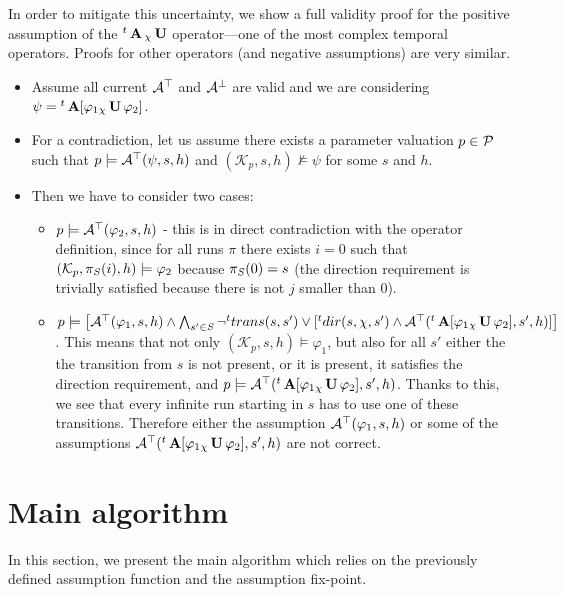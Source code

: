 In order to mitigate this uncertainty, we show a full validity proof for the positive assumption of the ${}^{t}\operatorname{\mathbf{A}}{}_{\chi}\operatorname{\mathbf{U}}$ operator—one of the most complex temporal operators. Proofs for other operators (and negative assumptions) are very similar.

\begin{itemize}
	\item Assume all current $\mathcal{A}^\top$ and $\mathcal{A}^\bot$ are valid and we are considering $ \psi = {}^{t} \operatorname{\mathbf{A}}[ \varphi_1 {}_{\chi}\operatorname{\mathbf{U}} \varphi_2 ]$.
	\item For a contradiction, let us assume there exists a parameter valuation $p \in \mathcal{P}$ such that $p \models \mathcal{A}^\top(\psi, s, h)$ and $(\mathcal{K}_p, s, h) \not\models \psi$ for some $s$ and $h$.
	\item Then we have to consider two cases:
	\begin{itemize}
		\item $p \models \mathcal{A}^\top(\varphi_2, s, h)$ - this is in direct contradiction with the operator definition, since for all runs $\pi$ there exists $i = 0$ such that $(\mathcal{K}_p, \pi_{\mathit{S}}(i), h) \models \varphi_2$ because $\pi_{\mathit{S}}(0) = s$ (the direction requirement is trivially satisfied because there is not $j$ smaller than $0$).
		\item $p \models \big[ \mathcal{A}^\top(\varphi_1, s, h) \land \bigwedge_{s' \in \mathit{S}} \neg{}^{t}trans(s,s') \lor [{}^{t}dir(s, \chi, s') \land \mathcal{A}^\top({}^{t}\operatorname{\mathbf{A}}[ \varphi_1 {}_{\chi}\operatorname{\mathbf{U}} \varphi_2], s', h)] \big]$. This means that not only $(\mathcal{K}_p, s, h) \models \varphi_1$, but also for all $s'$ either the the transition from $s$ is not present, or it is present, it satisfies the direction requirement, and $p \models \mathcal{A}^\top({}^{t}\operatorname{\mathbf{A}}[ \varphi_1 {}_{\chi}\operatorname{\mathbf{U}} \varphi_2], s', h)$. Thanks to this, we see that every infinite run starting in $s$ has to use one of these transitions. Therefore either the assumption $\mathcal{A}^\top(\varphi_1, s, h)$ or some of the assumptions $\mathcal{A}^\top({}^{t}\operatorname{\mathbf{A}}[ \varphi_1 {}_{\chi}\operatorname{\mathbf{U}} \varphi_2], s', h)$ are not correct.
	\end{itemize}
\end{itemize}

\section{Main algorithm}

In this section, we present the main algorithm which relies on the previously defined assumption function and the assumption fix-point.

